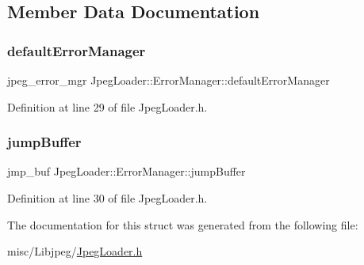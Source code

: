 \subsection{Member Data Documentation}
\mbox{\label{structJpegLoader_1_1ErrorManager_a491d5424c61b6ac0388e0c88c9237b68}} 
\subsubsection{\texorpdfstring{defaultErrorManager}{defaultErrorManager}}
{\footnotesize\ttfamily jpeg\+\_\+error\+\_\+mgr Jpeg\+Loader\+::\+Error\+Manager\+::default\+Error\+Manager}



Definition at line 29 of file Jpeg\+Loader.\+h.

\mbox{\label{structJpegLoader_1_1ErrorManager_a41824bc7f3e1d412c469b12a734c4dd4}} 
\subsubsection{\texorpdfstring{jumpBuffer}{jumpBuffer}}
{\footnotesize\ttfamily jmp\+\_\+buf Jpeg\+Loader\+::\+Error\+Manager\+::jump\+Buffer}



Definition at line 30 of file Jpeg\+Loader.\+h.



The documentation for this struct was generated from the following file\+:\begin{DoxyCompactItemize}
\item 
misc/\+Libjpeg/\mbox{\hyperlink{JpegLoader_8h}{Jpeg\+Loader.\+h}}\end{DoxyCompactItemize}
